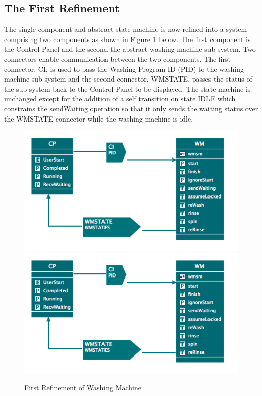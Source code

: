 \subsection{The First Refinement}
\label{sec:component_diagrams-tutorial_firstRefinement}


The single component and abstract state machine is now refined into a system comprising two components as shown in Figure \ref{fig:FirstRefinementOfWashingMachine} below. The first component is the Control Panel and the second the abstract washing machine sub-system. Two connectors enable communication between the two components. The first connector, CI, is used to pass the Washing Program ID (PID) to the washing machine sub-system and the second connector, WMSTATE, passes the status of the sub-system back to the Control Panel to be displayed. The state machine is unchanged except for the addition of a self transition on state IDLE which constrains the sendWaiting operation so that it only sends the waiting status over the WMSTATE connector while the washing machine is idle.
 
 \begin{figure}[!htbp]
  \centering
  \ifplastex
  \includegraphics[width=1024]{figures/image19.png}
  \else
  \includegraphics[width=1\textwidth]{figures/image19.png}
  \fi
  \caption{First Refinement of Washing Machine}
  \label{fig:FirstRefinementOfWashingMachine}
\end{figure} 

